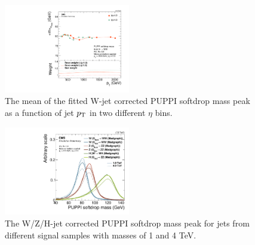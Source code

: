 \begin{figure}[h!]
\centering
\includegraphics[width=0.49\textwidth]{figures/analysis/search2/AN-16-235/plots/ClosureTest_RecoMass.pdf}
\caption{The mean of the fitted W-jet corrected PUPPI softdrop mass peak as a function of jet $p_{\mathrm{T}}$ in two different $\eta$ bins.}
\label{fig:searchII:wtagclosure}
\end{figure}
\begin{figure}[h!]
\centering
\includegraphics[width=0.49\textwidth]{figures/analysis/search2/AN-16-235/plots/SoftdropMass_NEWCORR_wH0.pdf}
\caption{The W/Z/H-jet corrected PUPPI softdrop mass peak for jets from different signal samples with masses of 1 and 4 TeV.}
\label{fig:search2:corrMass}
\end{figure}

